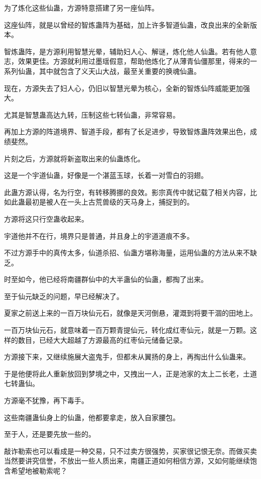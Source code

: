 \begin{this_body}
为了炼化这些仙蛊，方源特意搭建了另一座仙阵。

这座仙阵，就是以曾经的智炼蛊阵为基础，加上许多智道仙蛊，改良出来的全新版本。

智炼蛊阵，是方源利用智慧光晕，辅助妇人心、解谜，炼化他人仙蛊。若有他人意志，效果更佳。方源就利用过墨瑶假意，帮助他炼化了从薄青仙僵那里，得来的一系列仙蛊，其中就包含了义天山大战，最至关重要的换魂仙蛊。

现在，方源失去了妇人心，仍旧以智慧光晕为核心，全新的智炼仙阵威能更加强大。

尤其是智慧蛊高达九转，压制这些七转仙蛊，非常容易。

再加上方源的阵道境界、智道手段，都有了长足进步，导致智炼蛊阵效果出色，成绩斐然。

片刻之后，方源就将新盗取出来的仙蛊炼化。

这是一个宇道仙蛊，好像是一个湛蓝玉球，长着一对雪白的羽翅。

此蛊方源认得，名为行空，有转移腾挪的良效。影宗真传中就记载了相关内容，比如此蛊最初是被人在一头上古荒兽级的天马身上，捕捉到的。

方源将这只行空蛊收起来。

宇道他并不在行，境界只是普通，并且身上的宇道道痕不多。

不过方源手中的真传太多，仙道杀招、仙蛊方堪称海量，运用仙蛊的方法从来不缺乏。

时至如今，他已经将南疆群仙中的大半蛊仙的仙蛊，都掏了出来。

至于仙元缺乏的问题，早已经解决了。

夏家之前送上来的一百万块仙元石，就像是天河倒悬，灌溉到将要干涸的田地上。

一百万块仙元石，就意味着一百万颗青提仙元，转化成红枣仙元，就是一万颗。这样的数目，已经大大超越了方源最高的红枣仙元储备记录。

方源接下来，又继续施展大盗鬼手，但都未从翼扬的身上，再掏出什么仙蛊来。

于是他便将此人重新放回到梦境之中，又拽出一人，正是池家的太上二长老，土道七转蛊仙。

方源毫不犹豫，再下毒手。

这些南疆蛊仙身上的仙蛊，他都要拿走，放入自家腰包。

至于人，还是要先放一些的。

敲诈勒索也可以看成是一种交易，只不过卖方很强势，买家很记恨无奈。而做买卖当然要讲究信誉，不放出一些人质出来，南疆正道如何相信方源，又如何能继续饱含希望地被勒索呢？


\end{this_body}
